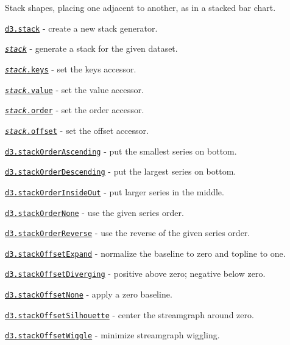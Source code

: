 Stack shapes, placing one adjacent to another, as in a stacked bar chart.


\begin{DoxyItemize}
\item \href{https://github.com/d3/d3-shape/blob/master/README.md#stack}{\tt d3.\+stack} -\/ create a new stack generator.
\item \href{https://github.com/d3/d3-shape/blob/master/README.md#_stack}{\tt {\itshape stack}} -\/ generate a stack for the given dataset.
\item \href{https://github.com/d3/d3-shape/blob/master/README.md#stack_keys}{\tt {\itshape stack}.keys} -\/ set the keys accessor.
\item \href{https://github.com/d3/d3-shape/blob/master/README.md#stack_value}{\tt {\itshape stack}.value} -\/ set the value accessor.
\item \href{https://github.com/d3/d3-shape/blob/master/README.md#stack_order}{\tt {\itshape stack}.order} -\/ set the order accessor.
\item \href{https://github.com/d3/d3-shape/blob/master/README.md#stack_offset}{\tt {\itshape stack}.offset} -\/ set the offset accessor.
\item \href{https://github.com/d3/d3-shape/blob/master/README.md#stackOrderAscending}{\tt d3.\+stack\+Order\+Ascending} -\/ put the smallest series on bottom.
\item \href{https://github.com/d3/d3-shape/blob/master/README.md#stackOrderDescending}{\tt d3.\+stack\+Order\+Descending} -\/ put the largest series on bottom.
\item \href{https://github.com/d3/d3-shape/blob/master/README.md#stackOrderInsideOut}{\tt d3.\+stack\+Order\+Inside\+Out} -\/ put larger series in the middle.
\item \href{https://github.com/d3/d3-shape/blob/master/README.md#stackOrderNone}{\tt d3.\+stack\+Order\+None} -\/ use the given series order.
\item \href{https://github.com/d3/d3-shape/blob/master/README.md#stackOrderReverse}{\tt d3.\+stack\+Order\+Reverse} -\/ use the reverse of the given series order.
\item \href{https://github.com/d3/d3-shape/blob/master/README.md#stackOffsetExpand}{\tt d3.\+stack\+Offset\+Expand} -\/ normalize the baseline to zero and topline to one.
\item \href{https://github.com/d3/d3-shape/blob/master/README.md#stackOffsetDiverging}{\tt d3.\+stack\+Offset\+Diverging} -\/ positive above zero; negative below zero.
\item \href{https://github.com/d3/d3-shape/blob/master/README.md#stackOffsetNone}{\tt d3.\+stack\+Offset\+None} -\/ apply a zero baseline.
\item \href{https://github.com/d3/d3-shape/blob/master/README.md#stackOffsetSilhouette}{\tt d3.\+stack\+Offset\+Silhouette} -\/ center the streamgraph around zero.
\item \href{https://github.com/d3/d3-shape/blob/master/README.md#stackOffsetWiggle}{\tt d3.\+stack\+Offset\+Wiggle} -\/ minimize streamgraph wiggling.
\end{DoxyItemize}

